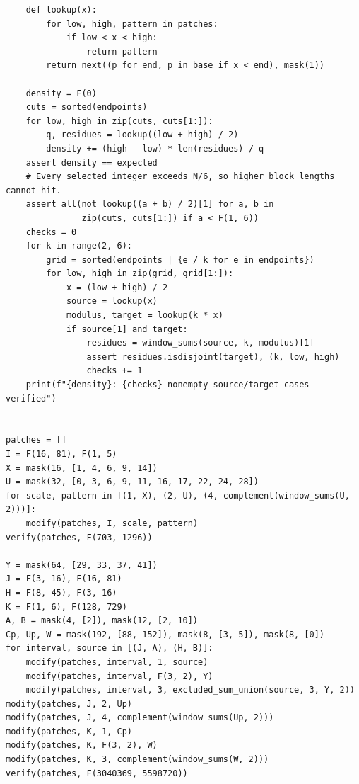 \documentclass[11pt]{article}
\begin{document}
{\begin{verbatim}
    def lookup(x):
        for low, high, pattern in patches:
            if low < x < high:
                return pattern
        return next((p for end, p in base if x < end), mask(1))

    density = F(0)
    cuts = sorted(endpoints)
    for low, high in zip(cuts, cuts[1:]):
        q, residues = lookup((low + high) / 2)
        density += (high - low) * len(residues) / q
    assert density == expected
    # Every selected integer exceeds N/6, so higher block lengths cannot hit.
    assert all(not lookup((a + b) / 2)[1] for a, b in
               zip(cuts, cuts[1:]) if a < F(1, 6))
    checks = 0
    for k in range(2, 6):
        grid = sorted(endpoints | {e / k for e in endpoints})
        for low, high in zip(grid, grid[1:]):
            x = (low + high) / 2
            source = lookup(x)
            modulus, target = lookup(k * x)
            if source[1] and target:
                residues = window_sums(source, k, modulus)[1]
                assert residues.isdisjoint(target), (k, low, high)
                checks += 1
    print(f"{density}: {checks} nonempty source/target cases verified")


patches = []
I = F(16, 81), F(1, 5)
X = mask(16, [1, 4, 6, 9, 14])
U = mask(32, [0, 3, 6, 9, 11, 16, 17, 22, 24, 28])
for scale, pattern in [(1, X), (2, U), (4, complement(window_sums(U, 2)))]:
    modify(patches, I, scale, pattern)
verify(patches, F(703, 1296))

Y = mask(64, [29, 33, 37, 41])
J = F(3, 16), F(16, 81)
H = F(8, 45), F(3, 16)
K = F(1, 6), F(128, 729)
A, B = mask(4, [2]), mask(12, [2, 10])
Cp, Up, W = mask(192, [88, 152]), mask(8, [3, 5]), mask(8, [0])
for interval, source in [(J, A), (H, B)]:
    modify(patches, interval, 1, source)
    modify(patches, interval, F(3, 2), Y)
    modify(patches, interval, 3, excluded_sum_union(source, 3, Y, 2))
modify(patches, J, 2, Up)
modify(patches, J, 4, complement(window_sums(Up, 2)))
modify(patches, K, 1, Cp)
modify(patches, K, F(3, 2), W)
modify(patches, K, 3, complement(window_sums(W, 2)))
verify(patches, F(3040369, 5598720))
\end{verbatim}}
\end{document}
